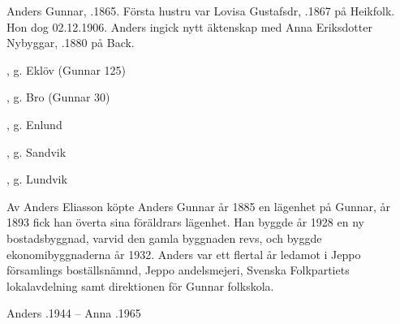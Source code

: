 Anders Gunnar, .1865. Första hustru var Lovisa Gustafsdr, .1867 på Heikfolk. Hon dog 02.12.1906. Anders ingick nytt äktenskap med Anna Eriksdotter Nybyggar, .1880 på Back.
\begin{jhchildren}
  \item {}
  \item {}
  \item {}, g. Eklöv (Gunnar 125)
  \item {}, g. Bro (Gunnar 30)
  \item {}, g. Enlund
  \item {}
  \item {}, g. Sandvik
  \item {}, g. Lundvik
  \item {}
  \item {}
  \item {}
\end{jhchildren}
Av Anders Eliasson köpte Anders Gunnar år 1885 en lägenhet på Gunnar, år 1893 fick han överta sina föräldrars lägenhet. Han byggde år 1928 en ny bostadsbyggnad, varvid den gamla byggnaden revs, och byggde ekonomibyggnaderna år 1932.					Anders var ett flertal år ledamot i Jeppo församlings boställsnämnd, Jeppo andelsmejeri, Svenska Folkpartiets lokalavdelning samt direktionen för Gunnar folkskola.

Anders .1944  --  Anna .1965


